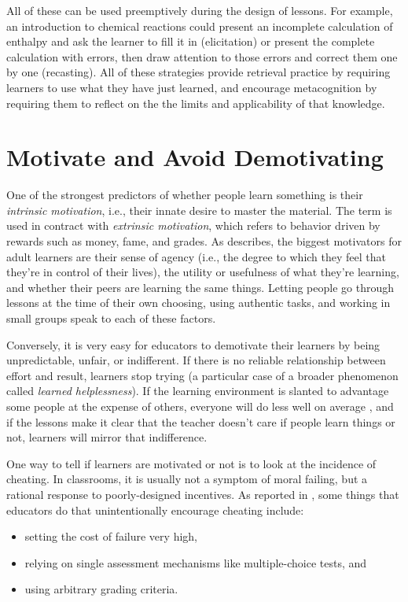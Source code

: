 \documentclass[10pt,letterpaper]{article}
\newcommand{\rulemajor}[1]{\section{#1}}
\begin{document}
All of these can be used preemptively during the design of lessons.  For
example, an introduction to chemical reactions could present an incomplete
calculation of enthalpy and ask the learner to fill it in (elicitation) or
present the complete calculation with errors, then draw attention to those
errors and correct them one by one (recasting).  All of these strategies provide
retrieval practice by requiring learners to use what they have just learned, and
encourage metacognition by requiring them to reflect on the the limits and
applicability of that knowledge.

\rulemajor{Motivate and Avoid Demotivating}

One of the strongest predictors of whether people learn something is their
\emph{intrinsic motivation}, i.e., their innate desire to master the material.
The term is used in contract with \emph{extrinsic motivation}, which refers to
behavior driven by rewards such as money, fame, and grades.  As \cite{Wlod2017}
describes, the biggest motivators for adult learners are their sense of agency
(i.e., the degree to which they feel that they're in control of their lives),
the utility or usefulness of what they're learning, and whether their peers are
learning the same things.  Letting people go through lessons at the time of
their own choosing, using authentic tasks, and working in small groups speak to
each of these factors.

Conversely, it is very easy for educators to demotivate their learners by being
unpredictable, unfair, or indifferent.  If there is no reliable relationship
between effort and result, learners stop trying (a particular case of a broader
phenomenon called \emph{learned helplessness}).  If the learning environment is
slanted to advantage some people at the expense of others, everyone will do less
well on average \cite{Wilk2011}, and if the lessons make it clear that the
teacher doesn't care if people learn things or not, learners will mirror that
indifference.

One way to tell if learners are motivated or not is to look at the incidence of
cheating.  In classrooms, it is usually not a symptom of moral failing, but a
rational response to poorly-designed incentives.  As reported in
\cite{Lang2013}, some things that educators do that unintentionally encourage
cheating include:

\begin{itemize}

\item setting the cost of failure very high,

\item relying on single assessment mechanisms like multiple-choice tests, and

\item using arbitrary grading criteria.

\end{itemize}
\end{document}
